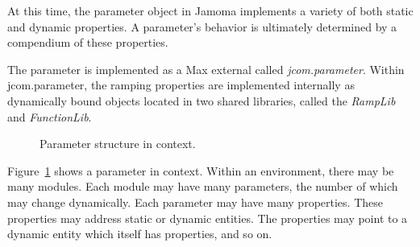 \documentclass{article}
\begin{document}
At this time, the parameter object in Jamoma implements a variety of both static and dynamic properties. A parameter's behavior is ultimately determined by a compendium of these properties. %

The parameter is implemented as a Max external called \emph{jcom.parameter}. Within jcom.parameter, the ramping properties are implemented internally as dynamically bound objects located in two shared libraries, called the \emph{RampLib} and \emph{FunctionLib}.


\begin{figure}
\centerline{}
\caption{Parameter structure in context.}
\label{fig:structure}
\end{figure}


Figure~\ref{fig:structure} shows a parameter in context. Within an environment, there may be many modules. Each module may have many parameters, the number of which may change dynamically. Each parameter may have many properties. These properties may address static or dynamic entities. The properties may point to a dynamic entity which itself has properties, and so on.
\end{document}
